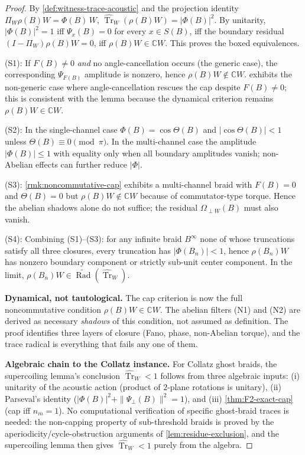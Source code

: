 \documentclass[11pt,a4paper]{article}
\theoremstyle{plain}
\theoremstyle{definition}
\theoremstyle{remark}
\numberwithin{equation}{section}
\newcommand{\Complex}{\mathbb{C}}
\DeclareMathOperator{\Tr}{Tr}
\DeclareMathOperator{\Rad}{Rad}
\begin{document}
\begin{proof}
By \cref{def:witness-trace-acoustic} and the projection identity
$\Pi_W\rho(B)W=\Phi(B)\,W$,
$\widehat{\Tr}_W(\rho(B)W)=|\Phi(B)|^2$.  By unitarity,
$|\Phi(B)|^2=1$ iff $\Psi_x(B)=0$ for every $x\in S(B)$, iff the
boundary residual $(I-\Pi_W)\rho(B)W=0$, iff
$\rho(B)W\in\Complex W$.  This proves the boxed equivalences.

(S1): If $F(B)\ne 0$ \emph{and} no angle-cancellation occurs (the
generic case), the corresponding $\Psi_{F(B)}$ amplitude is
nonzero, hence $\rho(B)W\notin\Complex W$.
 exhibits the non-generic
case where angle-cancellation rescues the cap despite $F(B)\ne 0$;
this is consistent with the lemma because the dynamical criterion
remains $\rho(B)W\in\Complex W$.

(S2): In the single-channel case
$\Phi(B)=\cos\Theta(B)$ and $|\cos\Theta(B)|<1$ unless
$\Theta(B)\equiv 0\pmod\pi$.  In the multi-channel case the
amplitude $|\Phi(B)|\le 1$ with equality only when all boundary
amplitudes vanish; non-Abelian effects can further reduce $|\Phi|$.

(S3): \cref{rmk:noncommutative-cap} exhibits a multi-channel
braid with $F(B)=0$ and $\Theta(B)=0$ but $\rho(B)W\notin\Complex W$
because of commutator-type torque.  Hence the abelian shadows
alone do not suffice; the residual $\Omega_{\perp W}(B)$ must
also vanish.

(S4): Combining (S1)--(S3): for any infinite braid
$B^{\infty}$ none of whose truncations satisfy all three
closures, every truncation has $|\Phi(B_n)|<1$, hence
$\rho(B_n)W$ has nonzero boundary component or strictly sub-unit
center component.  In the limit,
$\rho(B_n)W\in\widetilde{\Rad}(\widehat{\Tr}_W)$.

\textbf{Dynamical, not tautological.}  The cap criterion is now
the full noncommutative condition $\rho(B)W\in\Complex W$.
The abelian filters (N1) and (N2) are derived as necessary
\emph{shadows} of this condition, not assumed as definition.  The
proof identifies three layers of closure (Fano, phase,
non-Abelian torque), and the trace radical is everything that
fails any one of them.

\textbf{Algebraic chain to the Collatz instance.}  For Collatz
ghost braids, the supercoiling lemma's conclusion
$\widehat{\Tr}_W<1$ follows from three algebraic inputs: (i)
unitarity of the acoustic action (product of $2$-plane rotations
is unitary), (ii) Parseval's identity ($|\Phi(B)|^2+
\|\Psi_{\perp}(B)\|^2=1$), and (iii)
\cref{thm:F2-exact-cap} (cap iff $n_m=1$).  No computational
verification of specific ghost-braid traces is needed: the
non-capping property of sub-threshold braids is proved by the
aperiodicity/cycle-obstruction arguments of
\cref{lem:residue-exclusion}, and the supercoiling lemma then
gives $\widehat{\Tr}_W<1$ purely from the algebra.


\end{proof}
\end{document}
